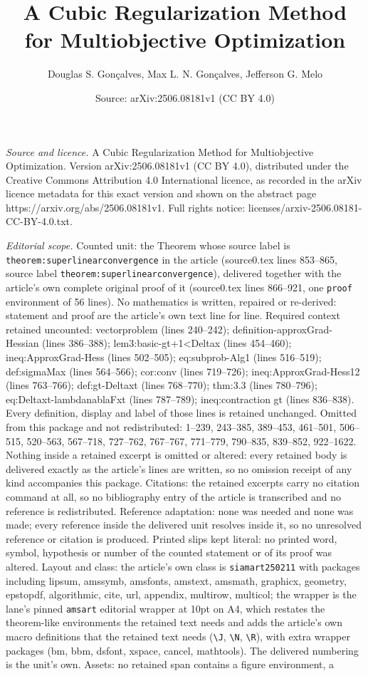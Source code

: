 \documentclass[10pt,a4paper]{amsart}
\title[A Cubic Regularization Method for Multiobjective Optimizatio]{A Cubic Regularization Method for Multiobjective Optimization}
\author{Douglas S. Gon\c{c}alves, Max L. N. Gon\c{c}alves, Jefferson G. Melo}
\date{Source: arXiv:2506.08181v1 (CC BY 4.0)}
\begin{document}
\maketitle

\noindent\emph{Source and licence.} A Cubic Regularization Method for Multiobjective Optimization. Version arXiv:2506.08181v1 (CC BY 4.0), distributed under the Creative Commons Attribution 4.0 International licence, as recorded in the arXiv licence metadata for this exact version and shown on the abstract page https://arxiv.org/abs/2506.08181v1. Full rights notice: licenses/arxiv-2506.08181-CC-BY-4.0.txt.\par\smallskip

\noindent\textit{Editorial scope.} Counted unit: the Theorem whose source label is \texttt{theorem:superlinearconvergence} in the article (source0.tex lines 853--865, source label \texttt{theorem:superlinearconvergence}), delivered together with the article's own complete original proof of it (source0.tex lines 866--921, one \texttt{proof} environment of 56 lines). No mathematics is written, repaired or re-derived: statement and proof are the article's own text line for line. Required context retained uncounted: vectorproblem (lines 240--242); definition-approxGrad-Hessian (lines 386--388); lem3:basic-gt+1<Deltax (lines 454--460); ineq:ApproxGrad-Hess (lines 502--505); eq:subprob-Alg1 (lines 516--519); def:sigmaMax (lines 564--566); cor:conv (lines 719--726); ineq:ApproxGrad-Hess12 (lines 763--766); def:gt-Deltaxt (lines 768--770); thm:3.3 (lines 780--796); eq:Deltaxt-lambdanablaFxt (lines 787--789); ineq:contraction gt (lines 836--838). Every definition, display and label of those lines is retained unchanged. Omitted from this package and not redistributed: 1--239, 243--385, 389--453, 461--501, 506--515, 520--563, 567--718, 727--762, 767--767, 771--779, 790--835, 839--852, 922--1622. Nothing inside a retained excerpt is omitted or altered: every retained body is delivered exactly as the article's lines are written, so no omission receipt of any kind accompanies this package. Citations: the retained excerpts carry no citation command at all, so no bibliography entry of the article is transcribed and no reference is redistributed. Reference adaptation: none was needed and none was made; every reference inside the delivered unit resolves inside it, so no unresolved reference or citation is produced. Printed slips kept literal: no printed word, symbol, hypothesis or number of the counted statement or of its proof was altered. Layout and class: the article's own class is \texttt{siamart250211} with packages including lipsum, amssymb, amsfonts, amstext, amsmath, graphicx, geometry, epstopdf, algorithmic, cite, url, appendix, multirow, multicol; the wrapper is the lane's pinned \texttt{amsart} editorial wrapper at 10pt on A4, which restates the theorem-like environments the retained text needs and adds the article's own macro definitions that the retained text needs (\texttt{\textbackslash J}, \texttt{\textbackslash N}, \texttt{\textbackslash R}), with extra wrapper packages (bm, bbm, dsfont, xspace, cancel, mathtools). The delivered numbering is the unit's own. Assets: no retained span contains a figure environment, a 
\end{document}
